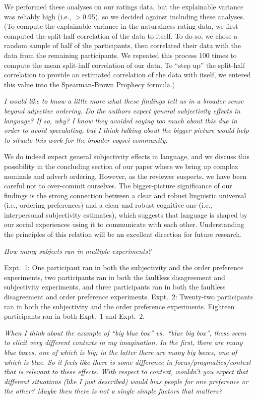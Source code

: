 \documentclass[12pt]{article}
\begin{document}
We performed these analyses on our ratings data, but the explainable variance was reliably high (i.e., $>$0.95), so we decided against including these analyses. (To compute the explainable variance in the naturalness rating data, we first computed the split-half correlation of the data to itself. To do so, we chose a random sample of half of the participants, then correlated their data with the data from the remaining participants. We repeated this process 100 times to compute the mean split-half correlation of our data. To ``step up'' the split-half correlation to provide an estimated correlation of the data with itself, we entered this value into the Spearman-Brown Prophecy formula.)

\item \emph{I would like to know a little more what these findings tell us in a broader sense beyond adjective ordering. Do the authors expect general subjectivity effects in language? If so, why? I know they avoided saying too much about this due in order to avoid speculating, but I think talking about the bigger picture would help to situate this work for the broader cogsci community.} 

We do indeed expect general subjectivity effects in language, and we discuss this possibility in the concluding section of our paper where we bring up complex nominals and adverb ordering. However, as the reviewer suspects, we have been careful not to over-commit ourselves. The bigger-picture significance of our findings is the strong connection between a clear and robust linguistic universal (i.e., ordering preferences) and a clear and robust cognitive one (i.e., interpersonal subjectivity estimates), which suggests that language is shaped by our social experiences using it to communicate with each other. Understanding the principles of this relation will be an excellent direction for future research.

\item \emph{How many subjects ran in multiple experiments?}

Expt.~1: One participant ran in both the subjectivity and the order preference experiments, two participants ran in both the faultless disagreement and subjectivity experiments, and three participants ran in both the faultless disagreement and order preference experiments. Expt.~2: Twenty-two participants ran in both the subjectivity and the order preference experiments. Eighteen participants ran in both Expt.~1 and Expt.~2.

\item \emph{When I think about the example of ``big blue box'' vs.~``blue big box'', these seem to elicit very different contexts in my imagination. In the first, there are many blue boxes, one of which is big; in the latter there are many big boxes, one of which is blue. So it feels like there is some difference in focus/pragmatics/context that is relevant to these effects. With respect to context, wouldn't you expect that different situations (like I just described) would bias people for one preference or the other? Maybe then there is not a single simple factors that matters?}
\end{document}

